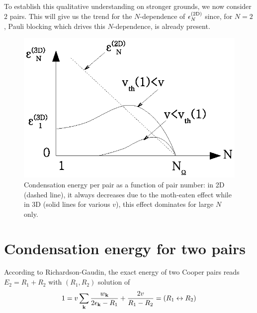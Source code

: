 \documentclass[5p,twocolumn]{elsarticle}
\begin{document}
To establish this qualitative understanding on stronger  grounds, we now consider $2$ pairs. This will give us the trend for the $N$-dependence of $\epsilon^{{\text{(2D)}}}_N$ since, for $N=2$, Pauli blocking which drives this $N$-dependence, is already present.  

\begin{figure}[htb]
	\centering
		\includegraphics[width=0.8\columnwidth]{3dCondChange.eps}
	\caption{Condensation energy per pair as a function of pair number: in 2D (dashed line), it always decreases due to the moth-eaten effect while in 3D (solid lines for various $v$), this effect dominates for large $N$ only.}
	\label{fig:3dCondChange}
\end{figure}

\section{Condensation energy for two pairs\label{sec:twoPair}}
According to Richardson-Gaudin, the exact energy of two Cooper pairs reads $E_2=R_1+R_2$ with $(R_1,R_2)$ solution of
\begin{equation}
1=v\sum_{\mathbf{k}}\frac{w_{\mathbf{k}}}{2\epsilon_{\mathbf{k}}-R_1}+\frac{2v}{R_1-R_2}=(R_{1}\leftrightarrow{}R_{2})
\label{eq:richardsonEq}
\end{equation}
\end{document}
